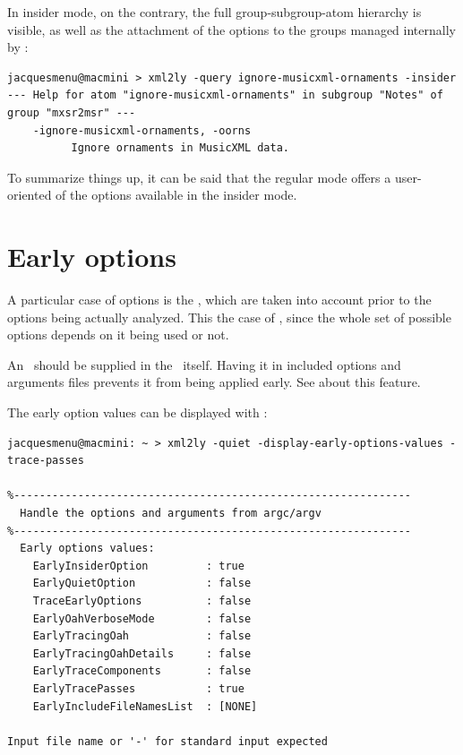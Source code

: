 In insider mode, on the contrary, the full group-subgroup-atom hierarchy is visible, as well as the attachment of the options to the groups managed internally by \mf:
\begin{lstlisting}[language=Terminal]
jacquesmenu@macmini > xml2ly -query ignore-musicxml-ornaments -insider
--- Help for atom "ignore-musicxml-ornaments" in subgroup "Notes" of group "mxsr2msr" ---
    -ignore-musicxml-ornaments, -oorns
          Ignore ornaments in MusicXML data.
\end{lstlisting}

To summarize things up, it can be said that the regular mode offers a user-oriented  of the options available in the insider mode.


\section{Early options}

A particular case of options is the , which are taken into account prior to the options being actually analyzed.
This the case of , since the whole set of possible options depends on it being used or not.

An \earlyOption\ should be supplied in the \CLI\ itself. Having it in included options and arguments files prevents it from being applied early. See  about this feature.

The early option values can be displayed with :
\begin{lstlisting}[language=Terminal]
jacquesmenu@macmini: ~ > xml2ly -quiet -display-early-options-values -trace-passes

%--------------------------------------------------------------
  Handle the options and arguments from argc/argv
%--------------------------------------------------------------
  Early options values:
    EarlyInsiderOption         : true
    EarlyQuietOption           : false
    TraceEarlyOptions          : false
    EarlyOahVerboseMode        : false
    EarlyTracingOah            : false
    EarlyTracingOahDetails     : false
    EarlyTraceComponents       : false
    EarlyTracePasses           : true
    EarlyIncludeFileNamesList  : [NONE]

Input file name or '-' for standard input expected
\end{lstlisting}


